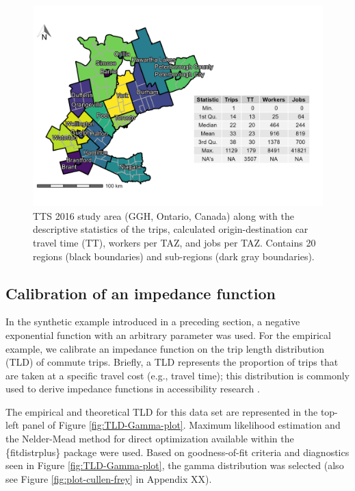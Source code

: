 \documentclass[]{elsarticle} %
\begin{document}
\begin{figure}

{\centering \includegraphics[width=0.8\linewidth]{images/TTS16-survey-area} 

}

\caption{\label{fig:TTS-16-survey-area}TTS 2016 study area (GGH, Ontario, Canada) along with the descriptive statistics of the trips, calculated origin-destination car travel time (TT), workers per TAZ, and jobs per TAZ. Contains 20 regions (black boundaries) and sub-regions (dark gray boundaries).}\label{fig:TTS-16-survey-area}
\end{figure}

\hypertarget{calibration-of-an-impedance-function}{%
\subsection{Calibration of an impedance
function}\label{calibration-of-an-impedance-function}}

In the synthetic example introduced in a preceding section, a negative
exponential function with an arbitrary parameter was used. For the
empirical example, we calibrate an impedance function on the trip length
distribution (TLD) of commute trips. Briefly, a TLD represents the
proportion of trips that are taken at a specific travel cost (e.g.,
travel time); this distribution is commonly used to derive impedance
functions in accessibility research
\citep{horbachov_theoretical_2018, batista_estimation_2019}.

The empirical and theoretical TLD for this data set are represented in
the top-left panel of Figure \ref{fig:TLD-Gamma-plot}. Maximum
likelihood estimation and the Nelder-Mead method for direct optimization
available within the \{fitdistrplus\} package \citep{fitdistrplus_2015}
were used. Based on goodness-of-fit criteria and diagnostics seen in
Figure \ref{fig:TLD-Gamma-plot}, the gamma distribution was selected
(also see Figure \ref{fig:plot-cullen-frey} in Appendix XX).
\end{document}
